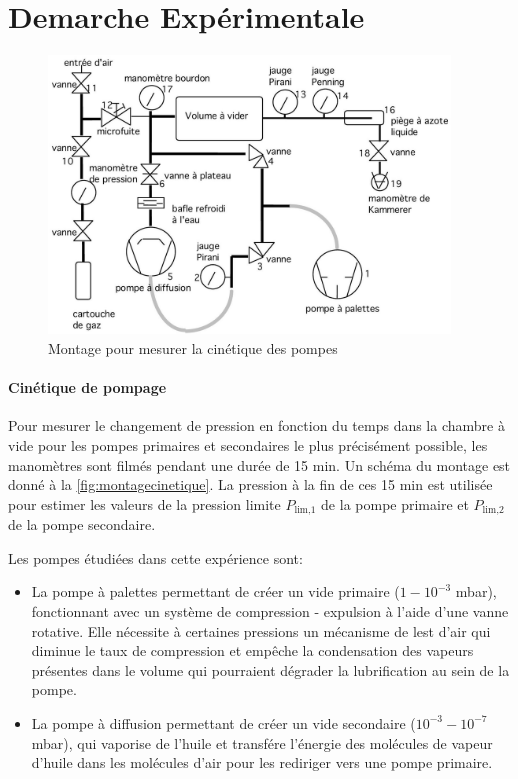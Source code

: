 \section{Demarche Expérimentale}

\begin{figure}[h]
    \centering
    \includegraphics[width=0.95\textwidth]{figures/montage_cinetique.png}
    \caption{Montage pour mesurer la cinétique des pompes}
    \label{fig:montagecinetique}
\end{figure}

\paragraph*{Cinétique de pompage}
Pour mesurer le changement de pression en fonction du temps dans la chambre à vide pour les pompes primaires et secondaires le plus précisément possible, les manomètres sont filmés pendant une durée de 15 \si{\minute}. Un schéma du montage est donné à la \autoref{fig:montagecinetique}. La pression à la fin de ces 15 \si{\minute} est utilisée pour estimer les valeurs de la pression limite \(P_\textrm{lim,1}\) de la pompe primaire et \(P_\textrm{lim,2}\) de la pompe secondaire.

Les pompes étudiées dans cette expérience sont:

\begin{itemize}
    \item La pompe à palettes permettant de créer un vide primaire (\(1 - 10^{-3}\) \si{\milli\bar}), fonctionnant avec un système de compression - expulsion à l'aide d'une vanne rotative. Elle nécessite à certaines pressions un mécanisme de lest d'air qui diminue le taux de compression et empêche la condensation des vapeurs présentes dans le volume qui pourraient dégrader la lubrification au sein de la pompe.
    \item La pompe à diffusion permettant de créer un vide secondaire (\(10^{-3} - 10^{-7}\) \si{\milli\bar}), qui vaporise de l'huile et transfére l'énergie des molécules de vapeur d'huile dans les molécules d'air pour les rediriger vers une pompe primaire. 
\end{itemize}

